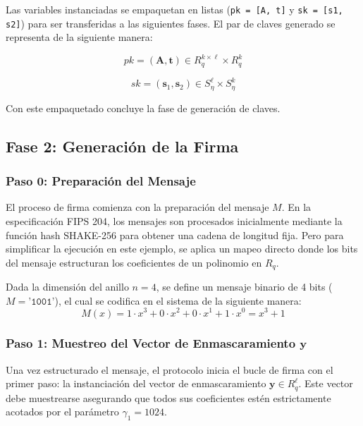 \documentclass[11pt, a4paper]{report}
\theoremstyle{definition}
\begin{document}
Las variables instanciadas se empaquetan en listas (\texttt{pk = [A, t]} y \texttt{sk = [s1, s2]}) para ser transferidas a las siguientes fases. El par de claves generado se representa de la siguiente manera:

\begin{equation}
    pk = (\mathbf{A}, \mathbf{t}) \in R_q^{k \times \ell} \times R_q^k
\end{equation}

\begin{equation}
    sk = (\mathbf{s}_1, \mathbf{s}_2) \in S_\eta^\ell \times S_\eta^k
\end{equation}

Con este empaquetado concluye la fase de generación de claves.


\subsection{Fase 2: Generación de la Firma}

\subsubsection*{Paso 0: Preparación del Mensaje}
El proceso de firma comienza con la preparación del mensaje $M$. En la especificación FIPS 204, los mensajes son procesados inicialmente mediante la función hash SHAKE-256 para obtener una cadena de longitud fija. Pero para simplificar la ejecución en este ejemplo, se aplica un mapeo directo donde los bits del mensaje estructuran los coeficientes de un polinomio en $R_q$. 

Dada la dimensión del anillo $n=4$, se define un mensaje binario de 4 bits ($M = \texttt{'1001'}$), el cual se codifica en el sistema de la siguiente manera:
\begin{equation}
    M(x) = 1 \cdot x^3 + 0 \cdot x^2 + 0 \cdot x^1 + 1 \cdot x^0 = x^3 + 1
\end{equation}

\subsubsection*{Paso 1: Muestreo del Vector de Enmascaramiento $\mathbf{y}$}
Una vez estructurado el mensaje, el protocolo inicia el bucle de firma con el primer paso: la instanciación del vector de enmascaramiento $\mathbf{y} \in R_q^\ell$. Este vector debe muestrearse asegurando que todos sus coeficientes estén estrictamente acotados por el parámetro $\gamma_1 = 1024$.
\end{document}
